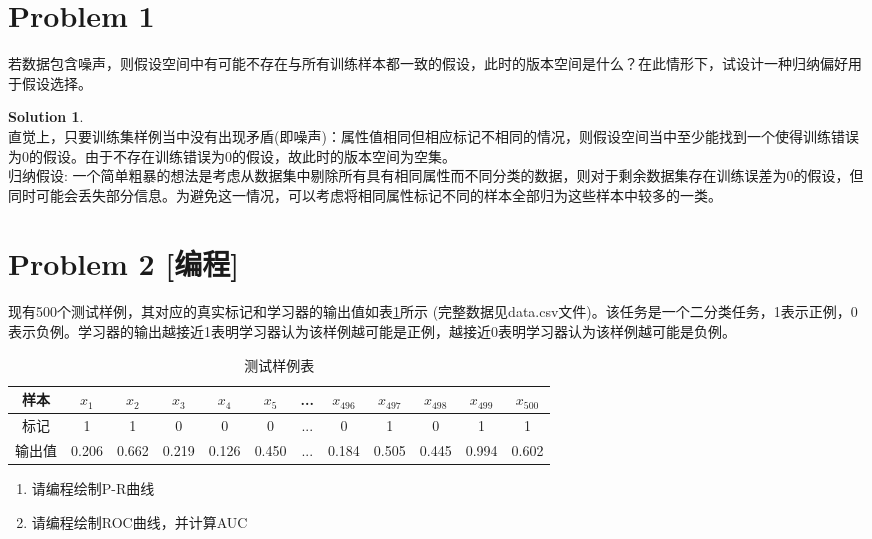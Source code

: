 \documentclass[a4paper,UTF8]{article}
\theoremstyle{definition}
\newtheorem*{solution}{Solution}
\begin{document}
\newpage
\section*{Problem 1}
若数据包含噪声，则假设空间中有可能不存在与所有训练样本都一致的假设，此时的版本空间是什么？在此情形下，试设计一种归纳偏好用于假设选择。
\begin{solution}
~\\直觉上，只要训练集样例当中没有出现矛盾(即噪声)：属性值相同但相应标记不相同的情况，则假设空间当中至少能找到一个使得训练错误为0的假设。由于不存在训练错误为0的假设，故此时的版本空间为空集。
~\\归纳假设: 一个简单粗暴的想法是考虑从数据集中剔除所有具有相同属性而不同分类的数据，则对于剩余数据集存在训练误差为0的假设，但同时可能会丢失部分信息。为避免这一情况，可以考虑将相同属性标记不同的样本全部归为这些样本中较多的一类。	
\end{solution}

\section*{Problem 2 [编程]} 
现有500个测试样例，其对应的真实标记和学习器的输出值如表\ref{table:roc}所示 (完整数据见data.csv文件)。该任务是一个二分类任务，1表示正例，0表示负例。学习器的输出越接近1表明学习器认为该样例越可能是正例，越接近0表明学习器认为该样例越可能是负例。
\begin{table}[!h]
	\centering
	\caption{测试样例表} \vspace{2mm}\label{table:roc}
	\begin{tabular}{c|c c c c c c c c c c c}\hline
		样本 & $x_1$ & $x_2$ & $x_3$  & $x_4$  & $x_5$&...& $x_{496}$& $x_{497}$ & $x_{498}$ & $x_{499}$ & $x_{500}$ \\
		\hline
		标记 & 1  & 1 &  0 &  0  & 0 &... &0& 1 & 0 & 1 & 1\\
		\hline
		输出值 & 0.206  & 0.662 &  0.219 &  0.126  & 0.450 & ... & 0.184&0.505 & 0.445 & 0.994 & 0.602\\
		\hline
	\end{tabular}
\end{table}
\begin{enumerate}[ {(}1{)}]
\item 请编程绘制P-R曲线
\item 请编程绘制ROC曲线，并计算AUC
\end{enumerate}
\end{document}
